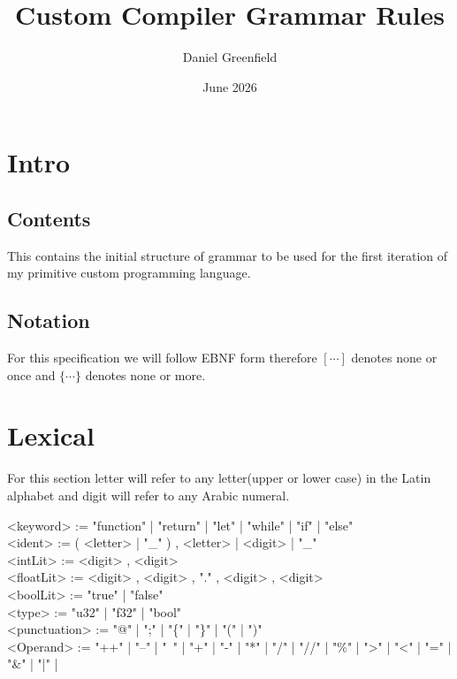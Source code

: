 \documentclass{article}
\title{Custom Compiler Grammar Rules}
\author{Daniel Greenfield}
\date{June 2026}
\begin{document}
\maketitle
\section{Intro}
\subsection{Contents}
This contains the initial structure of grammar to be used for the first iteration of my primitive custom programming language.
\subsection{Notation}
For this specification we will follow EBNF form therefore $[ \cdots ]$ denotes none or once and $\{ \cdots \}$ denotes none or more.
\section{Lexical}

For this section letter will refer to any letter(upper or lower case) in the Latin alphabet and digit will refer to any Arabic numeral.

\begin{ebnf} 
    <keyword> := "function" | "return" | "let" | "while" | "if" | "else" \\
    <ident> := ( <letter> | "\_" ) , { <letter> | <digit> | "\_" } \\
    <intLit> := <digit> , { <digit> } \\
    <floatLit> := <digit> , { <digit> } , "." , <digit> , { <digit> } \\
    <boolLit> := "true" | "false" \\
    <type> := "u32" | "f32" | "bool"\\
    <punctuation> := "@" | ";" | "\{" | "\}" | "(" | ")"\\
    <Operand> :=  "++" | "--" | "~" | "+" | "-" | "*" | "/" | "//" | "\%" | ">" | "<" | "=" | "\&" | "|" | 

   
\end{ebnf} 
\end{document}
